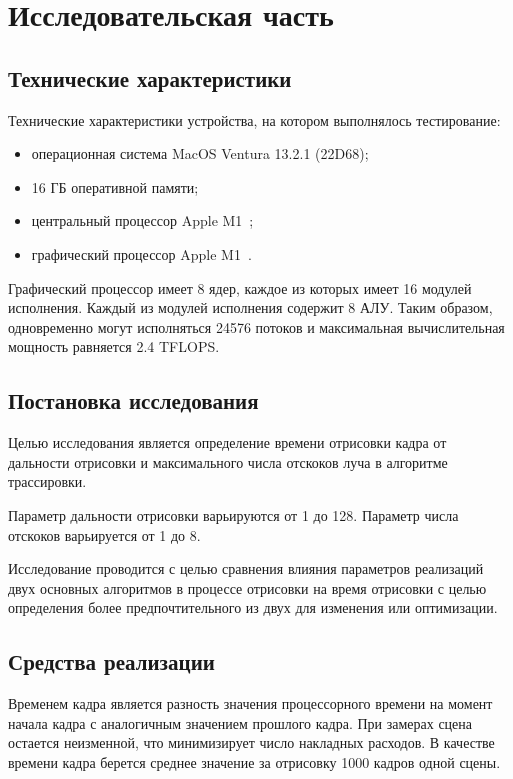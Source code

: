 \chapter{Исследовательская часть}

\section{Технические характеристики}

Технические характеристики устройства, на котором выполнялось тестирование:
\begin{itemize}
    \item операционная система MacOS Ventura 13.2.1 (22D68);
    \item 16 ГБ оперативной памяти;
    \item центральный процессор Apple M1~\cite{M1};
    \item графический процессор Apple M1~\cite{M1}.
\end{itemize}

Графический процессор имеет 8 ядер, каждое из которых имеет 16 модулей 
исполнения. Каждый из модулей исполнения содержит 8 АЛУ. Таким образом, 
одновременно могут исполняться 24576 потоков и максимальная вычислительная мощность
равняется 2.4 TFLOPS.

\section{Постановка исследования}

Целью исследования является определение времени отрисовки кадра 
от дальности отрисовки и максимального числа отскоков луча в алгоритме трассировки.

Параметр дальности отрисовки варьируются от 1 до 128. Параметр числа отскоков 
варьируется от 1 до 8.

Исследование проводится с целью сравнения влияния параметров реализаций двух 
основных алгоритмов в процессе отрисовки на время отрисовки с целью определения
более предпочтительного из двух для изменения или оптимизации.

\section{Средства реализации}

Временем кадра является разность значения процессорного времени на момент начала кадра с 
аналогичным значением прошлого кадра. При замерах сцена остается неизменной, что
минимизирует число накладных расходов. В качестве времени кадра берется
среднее значение за отрисовку 1000 кадров одной сцены.

